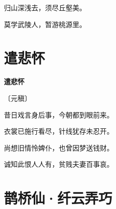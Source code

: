 \documentclass[12pt,UTF-8,openany,fontset=none]{ctexbook}
\begin{document}
    \vspace{18pt}

\begin{center}
    \begin{Large}

        归山深浅去，须尽丘壑美。

        莫学武陵人，暂游桃源里。

    \end{Large}

\end{center}

\vspace{8pt}
\clearpage

\section{遣悲怀}


\begin{center}
    {\bfseries 遣悲怀}

    \vspace{18pt}

    \begin{large}\xuwen
        〔元稹〕
    \end{large}

\end{center}

    \vspace{18pt}

\begin{center}
    \begin{Large}

        昔日戏言身后事，今朝都到眼前来。

        衣裳已施行看尽，针线犹存未忍开。

        尚想旧情怜婢仆，也曾因梦送钱财。

        诚知此恨人人有，贫贱夫妻百事哀。

    \end{Large}

\end{center}

\vspace{8pt}
\clearpage

\section{鹊桥仙·纤云弄巧}

\end{document}

